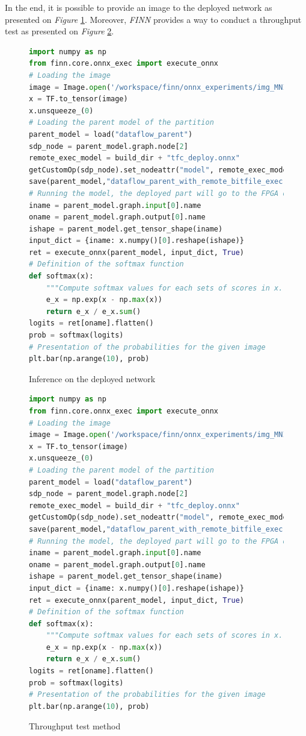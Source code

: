 In the end, it is possible to provide an image to the deployed network as presented on \emph{Figure} \ref{fig:DeployedInference}. Moreover, \emph{FINN} provides a way to conduct a throughput test as presented on \emph{Figure} \ref{fig:ThroughputTest}.

\begin{figure}[htbp]
\centering
\begin{lstlisting}[language=Python]
import numpy as np
from finn.core.onnx_exec import execute_onnx
# Loading the image
image = Image.open('/workspace/finn/onnx_experiments/img_MNIST.png')
x = TF.to_tensor(image)
x.unsqueeze_(0)
# Loading the parent model of the partition
parent_model = load("dataflow_parent")
sdp_node = parent_model.graph.node[2]
remote_exec_model = build_dir + "tfc_deploy.onnx"
getCustomOp(sdp_node).set_nodeattr("model", remote_exec_model)
save(parent_model,"dataflow_parent_with_remote_bitfile_exec")
# Running the model, the deployed part will go to the FPGA once the node is reached
iname = parent_model.graph.input[0].name
oname = parent_model.graph.output[0].name
ishape = parent_model.get_tensor_shape(iname)
input_dict = {iname: x.numpy()[0].reshape(ishape)}
ret = execute_onnx(parent_model, input_dict, True)
# Definition of the softmax function
def softmax(x):
    """Compute softmax values for each sets of scores in x."""
    e_x = np.exp(x - np.max(x))
    return e_x / e_x.sum()
logits = ret[oname].flatten()
prob = softmax(logits)
# Presentation of the probabilities for the given image
plt.bar(np.arange(10), prob)
\end{lstlisting}
\caption[Deployed Inference]{Inference on the deployed network}
  \label{fig:DeployedInference}
\end{figure}

\begin{figure}[htbp]
\centering
\begin{lstlisting}[language=Python]
import numpy as np
from finn.core.onnx_exec import execute_onnx
# Loading the image
image = Image.open('/workspace/finn/onnx_experiments/img_MNIST_grayscale.png')
x = TF.to_tensor(image)
x.unsqueeze_(0)
# Loading the parent model of the partition
parent_model = load("dataflow_parent")
sdp_node = parent_model.graph.node[2]
remote_exec_model = build_dir + "tfc_deploy.onnx"
getCustomOp(sdp_node).set_nodeattr("model", remote_exec_model)
save(parent_model,"dataflow_parent_with_remote_bitfile_exec")
# Running the model, the deployed part will go to the FPGA once the node is reached
iname = parent_model.graph.input[0].name
oname = parent_model.graph.output[0].name
ishape = parent_model.get_tensor_shape(iname)
input_dict = {iname: x.numpy()[0].reshape(ishape)}
ret = execute_onnx(parent_model, input_dict, True)
# Definition of the softmax function
def softmax(x):
    """Compute softmax values for each sets of scores in x."""
    e_x = np.exp(x - np.max(x))
    return e_x / e_x.sum()
logits = ret[oname].flatten()
prob = softmax(logits)
# Presentation of the probabilities for the given image
plt.bar(np.arange(10), prob)
\end{lstlisting}
\caption[Throughput Test]{Throughput test method}
  \label{fig:ThroughputTest}
\end{figure}
